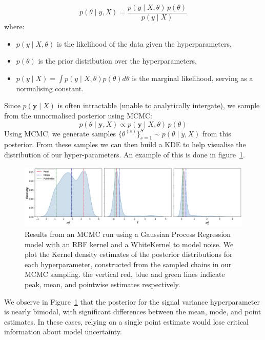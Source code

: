 \documentclass[10pt]{article}
\begin{document}
\begin{equation}
p(\theta \mid y, X) = \frac{p(y \mid X, \theta) \, p(\theta)}{p(y \mid X)}
\end{equation}
where:
\begin{itemize}
    \item \( p(y \mid X, \theta) \) is the likelihood of the data given the hyperparameters,
    \item \( p(\theta) \) is the prior distribution over the hyperparameters,
    \item \( p(y \mid X) = \int p(y \mid X,\theta)p(\theta)d\theta \) is the marginal likelihood, serving as a normalising constant.
\end{itemize}
Since \( p(\mathbf{y} \mid X) \) is often intractable (unable to analytically intergate), we sample from the unnormalised posterior using MCMC:
\begin{equation}
p(\theta \mid \mathbf{y}, X) \propto p(\mathbf{y} \mid X, \theta) \, p(\theta)
\end{equation}
%
%
Using MCMC, we generate samples \( \{\theta^{(s)}\}_{s=1}^S \sim p(\theta \mid y, X) \) from this posterior.
From these samples we can then build a KDE to help visualise the distribution of our hyper-parameters. An example of this is done in figure~\ref{fig:MCMCresults}.
\begin{figure}[H]
    \centering
    \includegraphics[width=\textwidth]{LatexPlots/1dplots/MCMCdistribution.png}
    \caption{
    Results from an MCMC run using a Gaussian Process Regression model with an RBF kernel and a WhiteKernel to model noise. We plot the Kernel density estimates of the posterior distributions for each hyperparameter, constructed from the sampled chains in our MCMC sampling. 
    the vertical red, blue and green lines indicate peak, mean, and pointwise estimates respectively.}
    \label{fig:MCMCresults}
\end{figure}
\noindent
We observe in Figure~\ref{fig:MCMCresults} that the posterior for the signal variance hyperparameter is nearly bimodal, with significant differences between the mean, mode, and point estimates. 
In these cases, relying on a single point estimate would lose critical information about model uncertainty.
\end{document}

